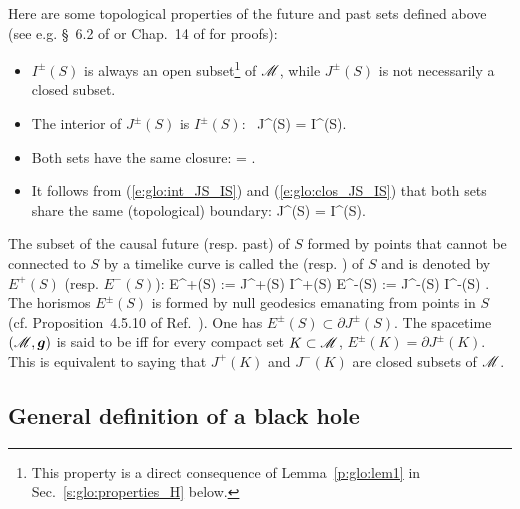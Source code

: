 Here are some topological properties of the future and past sets
defined above (see e.g. \S~6.2 of \cite{HawkiE73} or Chap.~14 of
\cite{ONeil83} for proofs):
\begin{itemize}
\item
$I^\pm(S)$ is always an open subset\footnote{This property is a direct
consequence of Lemma~\ref{p:glo:lem1} in Sec.~\ref{s:glo:properties_H} below.} of $\mathscr{M}$, while
$J^\pm(S)$ is not necessarily a closed subset.
\item The interior of $J^\pm(S)$ is $I^\pm(S)$:
\be \label{e:glo:int_JS_IS}
    \, J^\pm(S) = I^\pm(S).
\ee
\item Both sets have the same closure:
\be \label{e:glo:clos_JS_IS}
     =  .
\ee
\item
It follows from (\ref{e:glo:int_JS_IS}) and (\ref{e:glo:clos_JS_IS})
that both sets share the same (topological) boundary:
\be \label{e:glo:boundary_JS_IS}
    \partial J^\pm(S) = \partial I^\pm(S).
\ee
\end{itemize}
The subset of the causal future (resp. past) of $S$ formed by points that cannot be connected
to $S$ by a timelike curve is called the 
(resp. )
of $S$ and is denoted by $E^+(S)$ (resp. $E^-(S)$):
\be
    E^+(S) :=  J^+(S) \setminus I^+(S) \qand
    E^-(S) :=  J^-(S) \setminus I^-(S) .
\ee
The horismos $E^\pm(S)$ is formed by null geodesics emanating from points in $S$
(cf. Proposition~4.5.10 of Ref.~\cite{HawkiE73}).
One has $E^\pm(S) \subset \partial J^\pm(S)$.
The spacetime $(\mathscr{M},\bm{g})$
is said to be 
iff for every compact set $K\subset \mathscr{M}$, $E^\pm(K) = \partial J^\pm(K)$. This is
equivalent to saying that $J^+(K)$ and $J^-(K)$ are closed subsets of $\mathscr{M}$.

\subsection{General definition of a black hole} \label{s:glo:def_BH}

